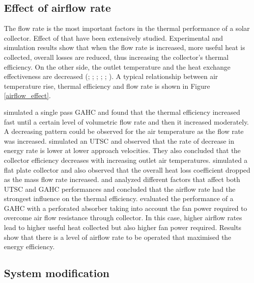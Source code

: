 \subsection{Effect of airflow rate}  

The flow rate is the most important factors in the thermal performance of a solar collector. Effect of that have been extensively studied. Experimental and simulation results show that when the flow rate is increased, more useful heat is collected, overall losses are reduced, thus increasing the collector's thermal efficiency. On the other side, the outlet temperature and the heat exchange effectiveness are decreased (\cite{Christensen1997}; \cite{Ammari2003}; \cite{Leon2007}; \cite{El-Sebaii2010}; \cite{Zomorodian2012}; \cite{Li2016}). A typical relationship between air temperature rise, thermal efficiency and flow rate is shown in Figure \ref{airflow_effect}.


\citet{Ammari2003} simulated a single pass GAHC and found that the thermal efficiency increased fast until a certain level of volumetric flow rate and then it increased moderately. A decreasing pattern could be observed for the air temperature as the flow rate was increased. \citet{Leon2007} simulated an UTSC and observed that the rate of decrease in energy rate is lower at lower approach velocities. They also concluded that the collector efficiency decreases with increasing outlet air temperatures. \citet{Jafarkazemi2013} simulated a flat plate collector and also observed that the overall heat loss coefficient dropped as the mass flow rate increased. \citet{Badache2014} and \citet{Nowzari2015} analyzed different factors that affect both UTSC and GAHC performances and concluded that the airflow rate had the strongest influence on the thermal efficiency. \citet{Li2016} evaluated the performance of a GAHC with a perforated absorber taking into account the fan power required to overcome air flow resistance through collector. In this case, higher airflow rates lead to higher useful heat collected but also higher fan power required. Results show that there is a level of airflow rate to be operated that maximised the energy efficiency.

\subsection{System modification}

